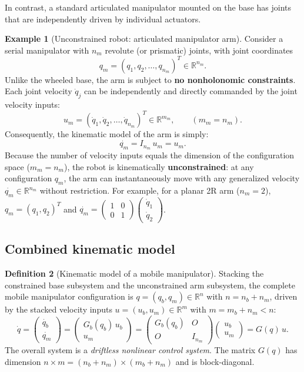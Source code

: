 \documentclass[11pt,a4paper]{article}
\def\bm#1{#1}%
\newcommand{\R}{\mathbb{R}}
\newcommand{\qbase}{\bm{q}_b}
\newcommand{\qarm}{\bm{q}_m}
\newcommand{\ubase}{\bm{u}_b}
\newcommand{\uarm}{\bm{u}_m}
\newcommand{\Gbase}{\bm{G}_b}
\theoremstyle{definition}
\newtheorem{definition}{Definition}[section]
\newtheorem{example}[definition]{Example}
\theoremstyle{plain}
\theoremstyle{remark}
\begin{document}
In contrast, a standard articulated manipulator mounted on the base has joints that are independently driven by individual actuators.

\begin{example}[Unconstrained robot: articulated manipulator arm]
Consider a serial manipulator with $n_m$ revolute (or prismatic) joints, with joint coordinates
\[
\qarm = (q_1, q_2, \dots, q_{n_m})^T \in \R^{n_m}.
\]
Unlike the wheeled base, the arm is subject to \textbf{no nonholonomic constraints}. Each joint velocity $\dot q_j$ can be independently and directly commanded by the joint velocity inputs:
\[
\uarm = (\dot q_1, \dot q_2, \dots, \dot q_{n_m})^T \in \R^{m_m},\qquad (m_m = n_m).
\]
Consequently, the kinematic model of the arm is simply:
\[
\dot{\qarm} = \bm I_{n_m}\,\uarm = \uarm .
\]
Because the number of velocity inputs equals the dimension of the configuration space ($m_m = n_m$), the robot is kinematically \textbf{unconstrained}: at any configuration $\qarm$, the arm can instantaneously move with any generalized velocity $\dot{\qarm}\in\R^{n_m}$ without restriction. For example, for a planar 2R arm ($n_m = 2$), $\qarm = (q_1, q_2)^T$ and $\dot{\qarm} = \begin{pmatrix}1 & 0\\ 0 & 1\end{pmatrix}\begin{pmatrix}\dot q_1\\ \dot q_2\end{pmatrix}$.
\end{example}

\subsection*{Combined kinematic model}

\begin{definition}[Kinematic model of a mobile manipulator]
Stacking the constrained base subsystem and the unconstrained arm subsystem, the complete mobile manipulator configuration is $\bm q = (\qbase, \qarm) \in \R^{n}$ with $n = n_b + n_m$, driven by the stacked velocity inputs $\bm u = (\ubase, \uarm) \in \R^{m}$ with $m = m_b + n_m < n$:
\[
\dot{\bm q}=\begin{pmatrix}\dot{\qbase}\\ \dot{\qarm}\end{pmatrix}
=\begin{pmatrix}\Gbase(\qbase)\,\ubase\\ \uarm\end{pmatrix}
=\begin{pmatrix}\Gbase(\qbase)&\bm O\\ \bm O&\bm I_{n_m}\end{pmatrix}
\begin{pmatrix}\ubase\\ \uarm\end{pmatrix}=\bm G(\bm q)\,\bm u .
\]
The overall system is a \emph{driftless nonlinear control system}. The matrix $\bm G(\bm q)$ has dimension $n \times m = (n_b + n_m) \times (m_b + n_m)$ and is block-diagonal.
\end{definition}
\end{document}
